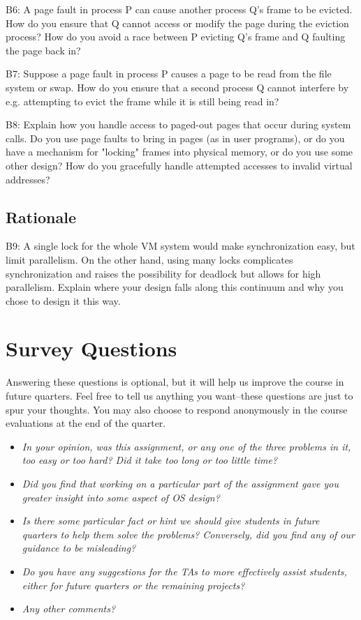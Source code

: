 \documentclass[journal]{IEEEtran}
\begin{document}
B6: A page fault in process P can cause another process Q's frame to be evicted.  How do you ensure that Q cannot access or modify the page during the eviction process?  How do you avoid a race between P evicting Q's frame and Q faulting the page back in?

B7: Suppose a page fault in process P causes a page to be read from the file system or swap.  How do you ensure that a second process Q cannot interfere by e.g. attempting to evict the frame while it is still being read in?

B8: Explain how you handle access to paged-out pages that occur during system calls.  Do you use page faults to bring in pages (as in user programs), or do you have a mechanism for "locking" frames into physical memory, or do you use some other design?  How do you gracefully handle attempted accesses to invalid virtual addresses?
\subsection{Rationale}
B9: A single lock for the whole VM system would make synchronization easy, but limit parallelism.  On the other hand, using many locks complicates synchronization and raises the possibility for deadlock but allows for high parallelism.  Explain where your design falls along this continuum and why you chose to design it this way.

\section{Survey Questions}
Answering these questions is optional, but it will help us improve the
course in future quarters.  Feel free to tell us anything you
want--these questions are just to spur your thoughts.  You may also
choose to respond anonymously in the course evaluations at the end of
the quarter.

\begin{itemize}
\item \textit{In your opinion, was this assignment, or any one of the three problems in it, too easy or too hard?  Did it take too long or too little time?}

\item \textit{Did you find that working on a particular part of the assignment gave you greater insight into some aspect of OS design?}

\item \textit{Is there some particular fact or hint we should give students in future quarters to help them solve the problems?  Conversely, did you find any of our guidance to be misleading?}

\item \textit{Do you have any suggestions for the TAs to more effectively assist students, either for future quarters or the remaining projects?}

\item \textit{Any other comments?}
\end{itemize}
\end{document}
